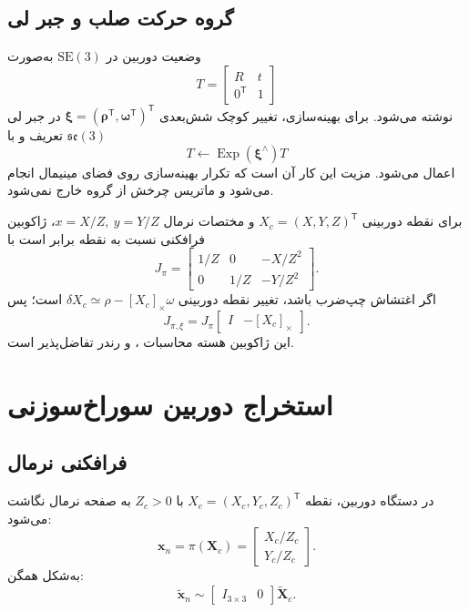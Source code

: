 \documentclass[12pt,openany,oneside]{book}
\newcommand{\trans}{^{\mathsf T}}
\newcommand{\vect}[1]{\bm{#1}}
\newcommand{\skewm}[1]{\left[#1\right]_{\times}}
\newcommand{\SE}{\mathrm{SE}}
\newcommand{\Exp}{\operatorname{Exp}}
\begin{document}
\subsection{گروه حرکت صلب و جبر لی}
وضعیت دوربین در \(\SE(3)\) به‌صورت
\begin{equation}
T=\begin{bmatrix}R&t\\0\trans&1\end{bmatrix}
\end{equation}
نوشته می‌شود. برای بهینه‌سازی، تغییر کوچک شش‌بعدی
\(\vect\xi=(\vect\rho\trans,\vect\omega\trans)\trans\)
در جبر لی \(\mathfrak{se}(3)\) تعریف و با
\begin{equation}
T\leftarrow\Exp(\vect\xi^\wedge)T
\end{equation}
اعمال می‌شود. مزیت این کار آن است که تکرار بهینه‌سازی روی فضای مینیمال انجام می‌شود و ماتریس چرخش از گروه خارج نمی‌شود.

\begin{proofbox}
برای نقطه دوربینی \(X_c=(X,Y,Z)\trans\) و مختصات نرمال
\(x=X/Z,\ y=Y/Z\)، ژاکوبین فرافکنی نسبت به نقطه برابر است با
\begin{equation}
J_\pi=\begin{bmatrix}
1/Z&0&-X/Z^2\\
0&1/Z&-Y/Z^2
\end{bmatrix}.
\end{equation}
اگر اغتشاش چپ‌ضرب باشد، تغییر نقطه دوربینی
\(\delta X_c\simeq \rho-\skewm{X_c}\omega\) است؛ پس
\begin{equation}
J_{\pi,\xi}=J_\pi\begin{bmatrix}I&-\skewm{X_c}\end{bmatrix}.
\end{equation}
این ژاکوبین هسته محاسبات ،  و رندر تفاضل‌پذیر است.
\end{proofbox}

\section{استخراج دوربین سوراخ‌سوزنی}

\subsection{فرافکنی نرمال}
در دستگاه دوربین، نقطه \(X_c=(X_c,Y_c,Z_c)\trans\) با \(Z_c>0\) به صفحه نرمال نگاشت می‌شود:
\begin{equation}
\vect x_n=\pi(\vect X_c)=
\begin{bmatrix}X_c/Z_c\\Y_c/Z_c\end{bmatrix}.
\label{eq:normalized-projection}
\end{equation}
به‌شکل همگن:
\begin{equation}
\widetilde{\vect x}_n\sim
\begin{bmatrix}I_{3\times3}&0\end{bmatrix}
\widetilde{\vect X}_c.
\end{equation}
\end{document}
